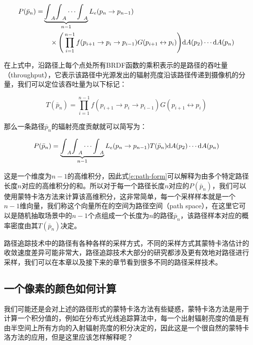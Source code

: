 \begin{equation}
	\begin{aligned}
		P(\bar{p}_n)=&\underbrace{{\rm \int}_A{\rm \int}_A \cdots{\rm \int}_A}_{n-1}L_e(p_n\to p_{n-1})\\
		&\quad\times\Bigg(\prod_{i=1}^{n-1}f(p_{i+1}\to p_i\to p_{i-1})G(p_{i+1}\leftrightarrow p_i)\Bigg) {\rm d}A(p_2)\cdots {\rm d}A(p_n)
	\end{aligned}
\end{equation}

\noindent 在上式中，沿路径上每个点处所有BRDF函数的乘积表示的是路径的吞吐量（throughput），它表示该路径中光源发出的辐射亮度沿该路径传递到摄像机的分量，我们可以定位该吞吐量为以下标记：

\begin{equation*}
	T(\bar{p}_n)=\prod_{i=1}^{n-1}f(p_{i+1}\to p_i\to p_{i-1})G(p_{i+1}\leftrightarrow p_i)
\end{equation*}

\noindent 那么一条路径$\bar{p}_n$的辐射亮度贡献就可以简写为：

\begin{equation*}
	P(\bar{p}_n)=\underbrace{{\rm \int}_A{\rm \int}_A \cdots{\rm \int}_A}_{n-1}L_e(p_n\to p_{n-1})T(\bar{p}_n) {\rm d}A(p_2)\cdots {\rm d}A(p_n)
\end{equation*} 

\noindent 这是一个维度为$n-1$的高维积分，因此式\ref{e:path-form}可以解释为由多个特定路径长度$n$对应的高维积分的和。所以对于每一个路径长度$n$对应的$P(\bar{p}_n)$，我们可以使用蒙特卡洛方法来计算该高维积分，这非常简单，每一个采样样本就是一个$n-1$维向量，我们称这个向量所在的空间为路径空间（path space），在这里它可以是随机抽取场景中的$n-1$个点组成一个长度为$n$的路径$\bar{p}_n$，该路径样本对应的概率密度由其$T(\bar{p}_n)$决定。

路径追踪技术中的路径有各种各样的采样方式，不同的采样方式其蒙特卡洛估计的收敛速度差异可能非常大，路径追踪技术大部分的研究都涉及更有效地对路径进行采样，我们可以在本章以及接下来的章节看到很多不同的路径采样技术。





\subsection{一个像素的颜色如何计算}\label{sec:pt-pixel-filter}
我们可能还是会对上述的路径形式的蒙特卡洛方法有些疑惑，蒙特卡洛方法是用于计算一个积分值的，例如在分布式光线追踪算法中，每一个出射辐射亮度的值是有由半空间上所有方向的入射辐射亮度的积分决定的，因此这是一个很自然的蒙特卡洛方法的应用，但是这里应该怎样解释呢？

